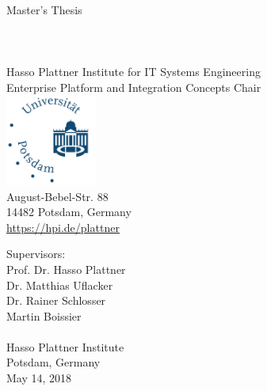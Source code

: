 \begin{titlepage}

\thispagestyle{empty}
\begin{center}
	\LARGE
	Master's Thesis\\
	\vspace{0.4cm}
	\Huge
    \TITLE{}\\
	\vspace{0.4cm}
	\vspace{0.5cm}
	\LARGE
	\textbf{\AUTHOR}\\
	\normalsize
  \Mail{\EMAIL}\\
	\vspace{0.4cm}
	\small
	Hasso Plattner Institute for IT Systems Engineering\\
	Enterprise Platform and Integration Concepts Chair\\
	\vspace{0.3cm}
	\hspace{1cm}
	\includegraphics[width=3cm]{figures/Universitaet_Potsdam_logo}\\
	\vspace{0.1cm}
	August-Bebel-Str. 88\\
	14482 Potsdam, Germany\\
	\url{https://hpi.de/plattner}\\
\end{center}
\vspace{0.7cm}
Supervisors:
\vspace{0.3cm}\\
Prof. Dr. Hasso Plattner\\
Dr. Matthias Uflacker\\
Dr. Rainer Schlosser\\
Martin Boissier\\
\vspace{0.3cm}\\
Hasso Plattner Institute\\
Potsdam, Germany
\vspace{0.4cm}\\
May 14, 2018
\end{titlepage}
